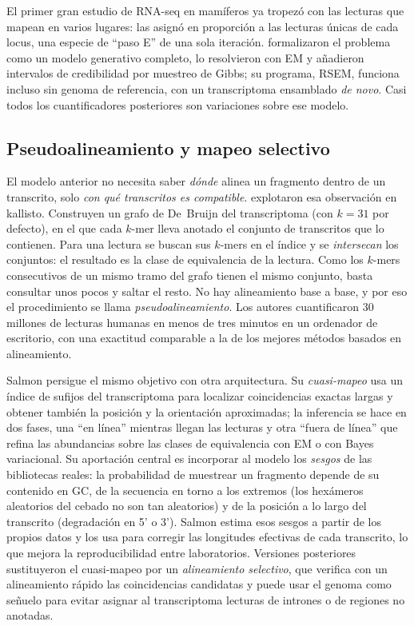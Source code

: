 \begin{historia}
El primer gran estudio de RNA-seq en mamíferos \parencite{c11-mortazavi2008} ya tropezó con las lecturas que mapean en varios lugares: las asignó en proporción a las lecturas únicas de cada locus, una especie de ``paso E'' de una sola iteración. \textcite{c11-li2011} formalizaron el problema como un modelo generativo completo, lo resolvieron con EM y añadieron intervalos de credibilidad por muestreo de Gibbs; su programa, RSEM, funciona incluso sin genoma de referencia, con un transcriptoma ensamblado \emph{de novo}. Casi todos los cuantificadores posteriores son variaciones sobre ese modelo.
\end{historia}

\subsection{Pseudoalineamiento y mapeo selectivo}

El modelo anterior no necesita saber \emph{dónde} alinea un fragmento dentro de un transcrito, solo \emph{con qué transcritos es compatible}. \textcite{c11-bray2016} explotaron esa observación en kallisto. Construyen un grafo de De~Bruijn del transcriptoma (con $k=31$ por defecto), en el que cada $k$-mer lleva anotado el conjunto de transcritos que lo contienen. Para una lectura se buscan sus $k$-mers en el índice y se \emph{intersecan} los conjuntos: el resultado es la clase de equivalencia de la lectura. Como los $k$-mers consecutivos de un mismo tramo del grafo tienen el mismo conjunto, basta consultar unos pocos y saltar el resto. No hay alineamiento base a base, y por eso el procedimiento se llama \emph{pseudoalineamiento}. Los autores cuantificaron 30 millones de lecturas humanas en menos de tres minutos en un ordenador de escritorio, con una exactitud comparable a la de los mejores métodos basados en alineamiento.

Salmon \parencite{c11-patro2017} persigue el mismo objetivo con otra arquitectura. Su \emph{cuasi-mapeo} usa un índice de sufijos del transcriptoma para localizar coincidencias exactas largas y obtener también la posición y la orientación aproximadas; la inferencia se hace en dos fases, una ``en línea'' mientras llegan las lecturas y otra ``fuera de línea'' que refina las abundancias sobre las clases de equivalencia con EM o con Bayes variacional. Su aportación central es incorporar al modelo los \emph{sesgos} de las bibliotecas reales: la probabilidad de muestrear un fragmento depende de su contenido en GC, de la secuencia en torno a los extremos (los hexámeros aleatorios del cebado no son tan aleatorios) y de la posición a lo largo del transcrito (degradación en 5' o 3'). Salmon estima esos sesgos a partir de los propios datos y los usa para corregir las longitudes efectivas de cada transcrito, lo que mejora la reproducibilidad entre laboratorios. Versiones posteriores sustituyeron el cuasi-mapeo por un \emph{alineamiento selectivo}, que verifica con un alineamiento rápido las coincidencias candidatas y puede usar el genoma como señuelo para evitar asignar al transcriptoma lecturas de intrones o de regiones no anotadas.

